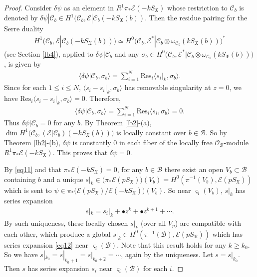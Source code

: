 \documentclass[12pt,b5paper,notitlepage]{report}
\theoremstyle{definition}
\theoremstyle{plain}
\newcommand{\fk}{\mathfrak}
\newcommand{\mc}{\mathcal}
\newcommand{\Res}{\mathrm{Res}}
\newcommand{\bk}[1]{\langle {#1}\rangle}
\newcommand{\scr}{\mathscr}
\newcommand{\sgm}{\varsigma}
\newcommand{\SX}{S_{\fk X}}
\numberwithin{equation}{section}
\begin{document}
\begin{proof}
Consider $\delta\psi$ as an element in $R^1\pi_*\scr E(-k\SX)$ whose restriction to $\mc C_b$ is denoted by $\delta\psi|\mc C_b\in H^1(\mc C_b,\scr E|\mc C_b(-k \SX(b))$. Then the residue pairing for the Serre duality
\begin{align*}
H^1(\mc C_b,\scr E|\mc C_b(-k \SX(b)))\simeq H^0\big(\mc C_b,\scr E^*|\mc C_b\otimes\omega_{\mc C_b}(k\SX(b))\big)^*
\end{align*}
(see Section \ref{lb4}), applied to $\delta\psi|\mc C_b$ and any $\sigma_b\in H^0\big(\mc C_b,\scr E^*|\mc C_b\otimes\omega_{\mc C_b}(k\SX(b))\big)$, is given by
\begin{align*}
\bk{\delta\psi|\mc C_b,\sigma_b}=\sum_{i=1}^N\Res_i\bk{s_i|_k,\sigma_b}.
\end{align*}
Since for each $1\leq i\leq N$, $\bk{s_i-s_i|_k,\sigma_b}$ has removable singularity at $z=0$, we have $\Res_i\bk{s_i-s_i|_k,\sigma_b}=0$. Therefore, 
\begin{align*}
\bk{\delta\psi|\mc C_b,\sigma_b}=\sum_{i=1}^N\Res_i\bk{s_i,\sigma_b}=0.
\end{align*}
Thus $\delta\psi|\mc C_b=0$ for any $b$. By Theorem \ref{lb2}-(a), $\dim H^1\big(\mc C_b,(\scr E|\mc C_b)(-k\SX(b))\big)$ is locally constant over $b\in\mc B$. So by Theorem \ref{lb2}-(b), $\delta\psi$ is constantly $0$ in each fiber of the locally free $\scr O_{\mc B}$-module $R^1\pi_*\scr E(-k\SX)$. This proves that $\delta\psi=0$. 

By \eqref{eq11} and that $\pi_*\scr E(-k\SX)=0$, for any $b\in\mc B$ there exist an open $V_b\subset\mc B$ containing $b$  and a unique $s|_k\in\big(\pi_*\scr E(p\SX)\big)(V_b)= H^0(\pi^{-1}(V_b),\scr E(p\SX))$ which is sent to $\psi\in \pi_*\big(\scr E(p\SX)/\scr E(-k\SX)\big)(V_b)$. So near $\sgm_i(V_b)$, $s|_k$ has series expansion
\begin{align}
s|_k=s_i|_k+\bullet z^k+\bullet z^{k+1}+\cdots.\label{eq12}
\end{align}
By such uniqueness, these locally chosen $s|_k$ (over all $V_p$) are compatible with each other, which produce a global $s|_k\in H^0(\pi^{-1}(\mc B),\scr E(p\SX))$ which has series expansion \eqref{eq12} near $\sgm_i(\mc B)$. Note that this result holds for any $k\geq k_0$. So we have $s|_{k_0}=s|_{k_0+1}=s|_{k_0+2}=\cdots$, again by the uniqueness. Let $s=s|_{k_0}$. Then $s$ has series expansion $s_i$ near $\sgm_i(\mc B)$ for each $i$.
\end{proof}
\end{document}
